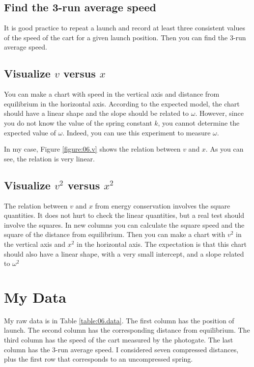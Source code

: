 \subsection{Find the 3-run average speed}
It is good practice to repeat a launch and record at least three consistent values of the speed of the cart for a given launch position. Then you can find the 3-run average speed.
\subsection{Visualize $v$ versus $x$}
You can make a chart with speed in the vertical axis and distance from equilibrium in the horizontal axis. According to the expected model, the chart should have a linear shape and the slope should be related to $\omega$. However, since you do not know the value of the spring constant $k$, you cannot determine the expected value of $\omega$. Indeed, you can use this experiment to measure $\omega$.

In my case, Figure \ref{figure:06.v} shows the relation between $v$ and $x$. As you can see, the relation is very linear.
\subsection{Visualize $v^{2}$ versus $x^{2}$}
The relation between $v$ and $x$ from energy conservation involves the square quantities. It does not hurt to check the linear quantities, but a real test should involve the squares. In new columns you can calculate the square speed and the square of the distance from equilibrium. Then you can make a chart with $v^{2}$ in the vertical axis and $x^{2}$ in the horizontal axis. The expectation is that this chart should also have a linear shape, with a very small intercept, and a slope related to $\omega^{2}$
\section{My Data}
My raw data is in Table \ref{table:06.data}. The first column has the position of launch. The second column has the corresponding distance from equilibrium. The third column has the speed of the cart measured by the photogate. The last column has the 3-run average speed. I considered seven compressed distances, plus the first row that corresponds to an uncompressed spring.
